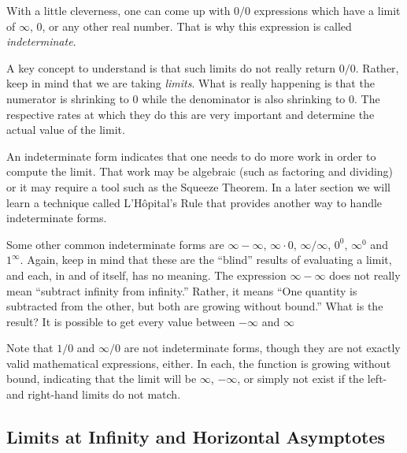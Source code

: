 
With a little cleverness, one can come up with $0/0$ expressions which have a limit of $\infty$, 0, or any other real number.  That is why this expression is called \emph{indeterminate}.

A key concept to understand is that such limits do not really return $0/0$. Rather, keep in mind that we are taking \emph{limits}. What is really happening is that the numerator is shrinking to 0 while the denominator is also shrinking to 0. The respective rates at which they do this are very important and determine the actual value of the limit.

An indeterminate form indicates that one needs to do more work in order to compute the limit. That work may be algebraic (such as factoring and dividing) or it may require a tool such as the Squeeze Theorem. %
 In a later section we will learn a technique called L'Hôpital's Rule that provides another way to handle indeterminate forms.  
 
Some other common indeterminate forms are $\infty-\infty$, $\infty\cdot 0$, $\infty/\infty$, $0^0$, $\infty^0$ and $1^{\infty}$. Again, keep in mind that these are the ``blind'' results of evaluating a limit, and each, in and of itself, has no meaning. The expression $\infty-\infty$ does not really mean ``subtract infinity from infinity.'' Rather, it means ``One quantity is subtracted from the other, but both are growing without bound.'' What is the result? It is possible to get every value between $-\infty$ and $\infty$

Note that $1/0$ and $\infty/0$ are not indeterminate forms, though they are not exactly valid mathematical expressions, either.  In each, the function is growing without bound, indicating that the limit will be $\infty$, $-\infty$, or simply not exist if the left- and right-hand limits do not match.


\subsection{Limits at Infinity and Horizontal Asymptotes}

